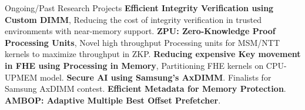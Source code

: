 \begin{rubric}{Ongoing/Past Research Projects}
 \textbf{Efficient Integrity Verification using Custom DIMM}, Reducing the cost of integrity verification in trusted environments with near-memory support.
%
 \textbf{ZPU: Zero-Knowledge Proof Processing Units}, Novel high throughput Processing units for MSM/NTT kernels to maximize throughput in ZKP.
% 
 \textbf{Reducing expensive Key movement in FHE using Processing in Memory}, Partitioning FHE kernels on CPU-UPMEM model.
% 
\entry*[08/21 -- 06/22] \textbf{Secure AI using Samsung's AxDIMM}. Finalists for Samsung AxDIMM contest.
\entry*[08/20 -- 03/21] \textbf{Efficient Metadata for Memory Protection}.
\entry*[03/19 -- 08/19] \textbf{AMBOP: Adaptive Multiple Best Offset Prefetcher}.

\end{rubric}